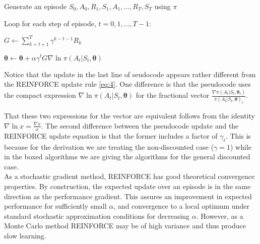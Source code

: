 {\begin{tcolorbox}[colback=black!7!white,colframe=black!75!white,title=\textbf{REINFORCE: Monte-Carlo Policy-Gradient Control (episodic) for $\pi_*$}]
    \qquad Generate an episode $S_0, A_0, R_1, S_1, A_1,\dots,R_T,S_T$ using $\pi$

    \qquad Loop for each step of episode, $t=0,1,\dots, T-1$:

    \qquad\qquad $G\leftarrow\sum_{k=t+1}^T\gamma^{k-t-1}R_k$

    \qquad\qquad $\bm{\theta}\leftarrow \bm{\theta}+\alpha\gamma^tG\nabla\ln\pi(A_t|S_t, \bm{\theta})$
\end{tcolorbox}
Notice that the update in the last line of seudocode appears rather different from the REINFORCE update rule \ref{eq:4}. One difference is that the pseudocode uses the compact expression $\nabla\ln\pi(A_t|S_t, \bm{\theta})$ for the fractional vector $\frac{\nabla\pi(A_t|S_t, \bm{\theta}_t)}{\pi(A_t|S_t, \bm{\theta})_t}$. 

That these two expressions for the vector are equivalent follows from the identity $\nabla\ln x=\frac{\nabla x}{x}$.
The second difference between the pseudocode update and the REINFORCE update equation is that the former includes a factor of $\gamma_t$. This is because for the derivation we are treating the non-discounted case ($\gamma=1$) while in the boxed
algorithms we are giving the algorithms for the general discounted case.\\

As a stochastic gradient method, REINFORCE has good theoretical convergence properties. By construction, the expected update over an episode is in the same direction as the performance gradient. This assures an improvement in expected performance for sufficiently small $\alpha$, and convergence to a local optimum under standard stochastic approximation conditions for decreasing $\alpha$. However, as a Monte Carlo method REINFORCE may be of high variance and thus produce slow learning.

}
